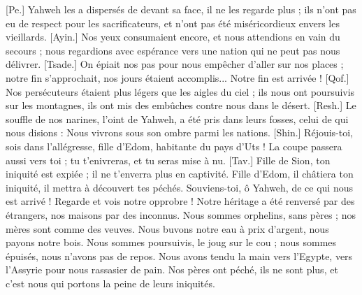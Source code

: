 \begin{multicols}{2}
[Pe.] Yahweh les a dispersés de devant sa face, il ne les regarde plus ; ils n’ont pas eu de respect pour les sacrificateurs, et n'ont pas été miséricordieux envers les vieillards.
[Ayin.] Nos yeux consumaient encore, et nous attendions en vain du secours ; nous regardions avec espérance vers une nation qui ne peut pas nous délivrer.
[Tsade.] On épiait nos pas pour nous empêcher d'aller sur nos places ; notre fin s'approchait, nos jours étaient accomplis... Notre fin est arrivée !
[Qof.] Nos persécuteurs étaient plus légers que les aigles du ciel ; ils nous ont poursuivis sur les montagnes, ils ont mis des embûches contre nous dans le désert.
[Resh.] Le souffle de nos narines, l’oint de Yahweh, a été pris dans leurs fosses, celui de qui nous disions : Nous vivrons sous son ombre parmi les nations.
[Shin.] Réjouis-toi, sois dans l’allégresse, fille d’Edom, habitante du pays d'Uts ! La coupe passera aussi vers toi ; tu t'enivreras, et tu seras mise à nu.
[Tav.] Fille de Sion, ton iniquité est expiée ; il ne t'enverra plus en captivité. Fille d’Edom, il châtiera ton iniquité, il mettra à découvert tes péchés.
\VerseOne{}Souviens-toi, ô Yahweh, de ce qui nous est arrivé ! Regarde et vois notre opprobre !
Notre héritage a été renversé par des étrangers, nos maisons par des inconnus.
Nous sommes orphelins, sans pères ; nos mères sont comme des veuves.
Nous buvons notre eau à prix d’argent, nous payons notre bois.
Nous sommes poursuivis, le joug sur le cou ; nous sommes épuisés, nous n’avons pas de repos.
Nous avons tendu la main vers l'Egypte, vers l'Assyrie pour nous rassasier de pain.
Nos pères ont péché, ils ne sont plus, et c’est nous qui portons la peine de leurs iniquités.

\end{multicols}
